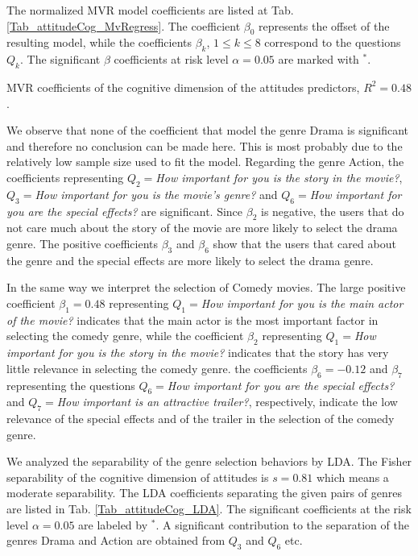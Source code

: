 \documentclass{llncs}
\def\a{{\alpha}}
\def\b{{\beta}}
\begin{document}
The normalized MVR model coefficients are listed at Tab. \ref{Tab_attitudeCog_MvRegress}. The coefficient $\b_0$ 
represents the offset of the resulting model, while the coefficients $\b_k$, $1\leq k \leq 8$ correspond to the questions $Q_k$. The significant $\b$ coefficients at risk level $\a=0.05$ are marked with $^*$. 
\begin{table}[!h]
  \centering
   
  \caption{MVR coefficients of the cognitive dimension of the attitudes predictors, $R^2 = 0.48$.}
  \label{Tab_attitudeCog_MvRegress}
\end{table}
We observe that none of the coefficient that model the genre Drama is significant and therefore no conclusion can be made here. This is most probably due to the relatively low sample size used to fit the model. Regarding the genre Action, the coefficients representing $Q_2=${\it How important for you is the story in the movie?}, $Q_3=${\it How important for you is the movie's genre?} and $Q_6=${\it How important for you are the special effects?} are significant. Since $\b_2$ is negative, the users that do not care much about the story of the movie are more likely to select the drama genre. The positive coefficients $\b_3$ and $\b_6$ show that the users that cared about the genre and the special effects are more likely to select the drama genre. 

In the same way we interpret the selection of Comedy movies. The large positive coefficient $\b_1=0.48$ representing $Q_1=${\it How important for you is the main actor of the movie?} indicates that the main actor is the most important factor in selecting the comedy genre, while the coefficient $\b_2$ representing $Q_1=${\it How important for you is the story in the movie?} indicates that the story has very little relevance in selecting the comedy genre. the coefficients $\b_6=-0.12$ and $\b_7$ representing the questions $Q_6=${\it How important for you are the special effects?} and $Q_7=${\it How important is an attractive trailer?}, respectively, indicate the low relevance of the special effects and of the trailer in the selection of the comedy genre. 

We analyzed the separability of the genre selection behaviors by LDA. The Fisher separability of the cognitive dimension of attitudes is $s = 0.81$ which means a moderate separability. The LDA coefficients separating the given pairs of genres are listed in Tab. \ref{Tab_attitudeCog_LDA}. The significant coefficients at the risk level $\a=0.05$ are labeled by $^*$. A significant contribution to the separation of the genres Drama and Action are obtained from $Q_3$ and $Q_6$ etc. 
\end{document}
